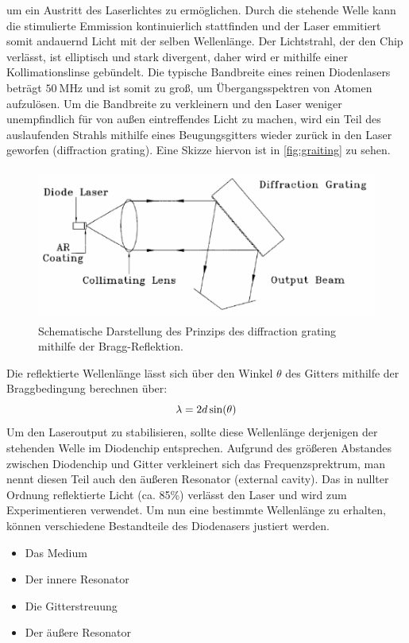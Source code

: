 um ein Austritt des Laserlichtes zu ermöglichen. Durch die stehende Welle kann die stimulierte Emmission kontinuierlich stattfinden
und der Laser emmitiert somit andauernd Licht mit der selben Wellenlänge.
Der Lichtstrahl, der den Chip verlässt, ist elliptisch und stark divergent, daher wird er mithilfe einer Kollimationslinse gebündelt.
Die typische Bandbreite eines reinen Diodenlasers beträgt $\qty{50}{\mega\hertz}$ und ist somit zu groß, um Übergangsspektren
von Atomen aufzulösen.
Um die Bandbreite zu verkleinern und den Laser weniger unempfindlich für von außen eintreffendes Licht zu machen, wird ein
Teil des auslaufenden Strahls mithilfe eines Beugungsgitters wieder zurück in den Laser geworfen (diffraction grating).
Eine Skizze hiervon ist in \autoref{fig:graiting} zu sehen.
\begin{figure}[H]
    \centering
    \includegraphics[height=5cm]{content/pics/graiting.png}
    \caption{Schematische Darstellung des Prinzips des diffraction grating mithilfe der Bragg-Reflektion. \cite{V60}}
    \label{fig:graiting}
\end{figure}
Die reflektierte Wellenlänge lässt sich über den Winkel $\theta$ des Gitters mithilfe der Braggbedingung berechnen über:
\begin{equation}
    \notag
    \lambda = 2d \sin(\theta)
\end{equation}
Um den Laseroutput zu stabilisieren, sollte diese Wellenlänge derjenigen der stehenden Welle im Diodenchip entsprechen.
Aufgrund des größeren Abstandes zwischen Diodenchip und Gitter verkleinert sich das Frequenzsprektrum, man nennt diesen Teil
auch den äußeren Resonator (external cavity).
Das in nullter Ordnung reflektierte Licht (ca. 85\%) verlässt den Laser und wird zum Experimentieren verwendet.
Um nun eine bestimmte Wellenlänge zu erhalten, können verschiedene Bestandteile des Diodenasers justiert werden.
\begin{itemize}
    \item Das Medium
    \item Der innere Resonator
    \item Die Gitterstreuung
    \item Der äußere Resonator
\end{itemize}
